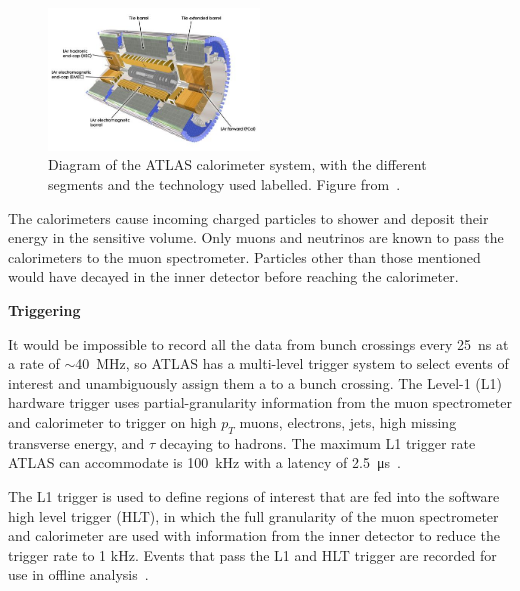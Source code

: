 \begin{figure}
    \centering
    \includegraphics[width = 0.5\textwidth]{figures/atlas_calorimeter.png}
    \caption{Diagram of the ATLAS calorimeter system, with the different segments and the technology used labelled. Figure from~\cite{collaboration_atlas_2008}.}
    \label{fig:atlas_calorimeter}
\end{figure}

The calorimeters cause incoming charged particles to shower and deposit their energy in the sensitive volume. Only muons and neutrinos are known to pass the calorimeters to the muon spectrometer.  Particles other than those mentioned would have decayed in the inner detector before reaching the calorimeter. 

\textbf{Triggering}

It would be impossible to record all the data from bunch crossings every \SI{25}{\nano\second} at a rate of $\sim$\SI{40}{MHz}, so ATLAS has a multi-level trigger system to select events of interest and unambiguously assign them a to a bunch crossing. The Level-1 (L1) hardware trigger uses partial-granularity information from the muon spectrometer and calorimeter to trigger on high $p_T$ muons, electrons, jets, high missing transverse energy, and $\tau$ decaying to hadrons. The maximum L1 trigger rate ATLAS can accommodate is \SI{100}{kHz} with a latency of \SI{2.5}{\micro\second}~\cite{atlas_l1_trigger_tdr}. 


The L1 trigger is used to define regions of interest that are fed into the software high level trigger (HLT), in which the full granularity of the muon spectrometer and calorimeter are used with information from the inner detector to reduce the trigger rate to 1 kHz. Events that pass the L1 and HLT trigger are recorded for use in offline analysis~\cite{atlas_hlt_trigger_tdr}.

